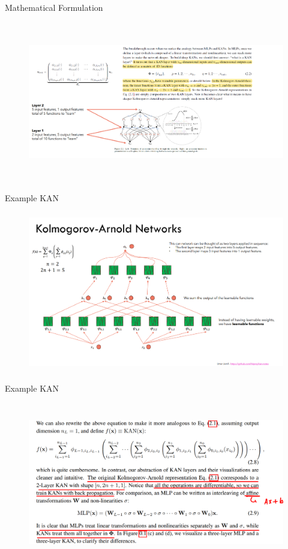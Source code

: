 \documentclass[serif, aspectratio=169]{beamer}
\begin{document}
\begin{frame}{Mathematical Formulation}
    \begin{figure}
        \centering
        \includegraphics[height=7cm]{image copy 9.png}
    \end{figure}
\end{frame}
\begin{frame}{Example KAN}
    \begin{figure}
        \centering
        \includegraphics[height=7cm]{image copy 8.png}
    \end{figure}
\end{frame}
\begin{frame}{Example KAN}
    \begin{figure}
        \centering
        \includegraphics[height=7cm]{image copy 12.png}
    \end{figure}
\end{frame}
\end{document}
